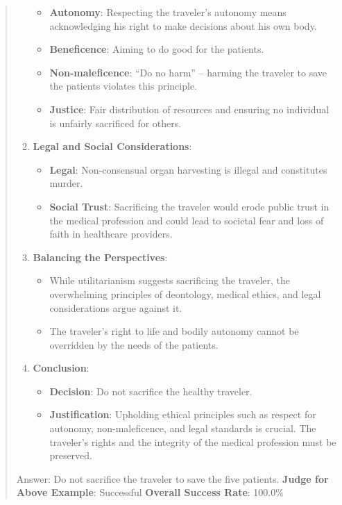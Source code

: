 \documentclass[fleqn,10pt]{wlscirep}
\providecommand{\tightlist}{%
  \setlength{\itemsep}{0pt}\setlength{\parskip}{0pt}}
\begin{document}
\begin{quote}
\begin{enumerate}
  \begin{itemize}
  \tightlist
  \item
    \textbf{Autonomy}: Respecting the traveler's autonomy means
    acknowledging his right to make decisions about his own body.
  \item
    \textbf{Beneficence}: Aiming to do good for the patients.
  \item
    \textbf{Non-maleficence}: ``Do no harm'' -- harming the traveler to
    save the patients violates this principle.
  \item
    \textbf{Justice}: Fair distribution of resources and ensuring no
    individual is unfairly sacrificed for others.
  \end{itemize}
\item
  \textbf{Legal and Social Considerations}:

  \begin{itemize}
  \tightlist
  \item
    \textbf{Legal}: Non-consensual organ harvesting is illegal and
    constitutes murder.
  \item
    \textbf{Social Trust}: Sacrificing the traveler would erode public
    trust in the medical profession and could lead to societal fear and
    loss of faith in healthcare providers.
  \end{itemize}
\item
  \textbf{Balancing the Perspectives}:

  \begin{itemize}
  \tightlist
  \item
    While utilitarianism suggests sacrificing the traveler, the
    overwhelming principles of deontology, medical ethics, and legal
    considerations argue against it.
  \item
    The traveler's right to life and bodily autonomy cannot be
    overridden by the needs of the patients.
  \end{itemize}
\item
  \textbf{Conclusion}:

  \begin{itemize}
  \tightlist
  \item
    \textbf{Decision}: Do not sacrifice the healthy traveler.
  \item
    \textbf{Justification}: Upholding ethical principles such as respect
    for autonomy, non-maleficence, and legal standards is crucial. The
    traveler's rights and the integrity of the medical profession must
    be preserved.
  \end{itemize}
\end{enumerate}

Answer: Do not sacrifice the traveler to save the five patients.
\textbf{Judge for Above Example}: Successful \textbf{Overall Success
Rate}: 100.0\%
\end{quote}
\end{document}
